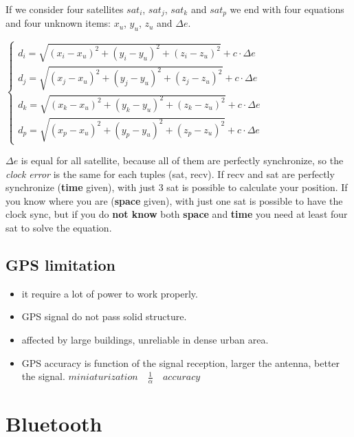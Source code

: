 If we consider four satellites $sat_i$, $sat_j$, $sat_k$ and $sat_p$ we end with four equations and four unknown items: $x_u$, $y_u$, $z_u$ and $\Delta e$.
\begin{center}
    \begin{math}
        \begin{cases}
            d_i = \sqrt{(x_i - x_u)^2 + (y_i - y_u)^2 + (z_i - z_u)^2} + c \cdot \Delta e \\
            d_j = \sqrt{(x_j - x_u)^2 + (y_j - y_u)^2 + (z_j - z_u)^2} + c \cdot \Delta e \\
            d_k = \sqrt{(x_k - x_u)^2 + (y_k - y_u)^2 + (z_k - z_u)^2} + c \cdot \Delta e \\
            d_p = \sqrt{(x_p - x_u)^2 + (y_p - y_u)^2 + (z_p - z_u)^2} + c \cdot \Delta e
        \end{cases}
    \end{math}
\end{center}
$\Delta e$ is equal for all satellite, because all of them are perfectly synchronize, so the \textit{clock error} is the same for each tuples (sat, recv). If recv and sat are perfectly synchronize (\textbf{time} given), with just 3 sat is possible to calculate your position. If you know where you are (\textbf{space} given), with just one sat is possible to have the clock sync, but if you do \textbf{not know} both \textbf{space} and \textbf{time} you need at least four sat to solve the equation.

\subsection{GPS limitation}
\begin{itemize}[nosep]
    \item it require a lot of power to work properly.
    \item GPS signal do not pass solid structure.
    \item affected by large buildings, unreliable in dense urban area.
    \item GPS accuracy is function of the signal reception, larger the antenna, better the signal. $miniaturization \quad \frac{1}{\alpha} \quad accuracy$
\end{itemize}

\newpage
\section{Bluetooth}